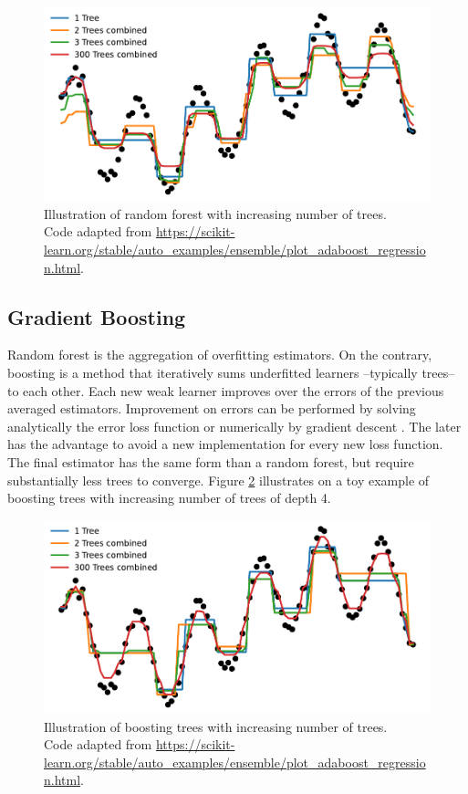 \documentclass[french,12pt,twoside,a4paper]{book}
\begin{document}
\begin{appendices}
  \begin{figure}[!t]
    \centering
    \includegraphics[width=0.8\linewidth]{img/chapter_1/forest_4.pdf}
    \caption{Illustration of random forest with increasing number of
      trees.\\Code adapted from
      \url{https://scikit-learn.org/stable/auto_examples/ensemble/plot_adaboost_regression.html}.}%
    \label{fig:forest_regression}
  \end{figure}


  \subsection{Gradient Boosting}\label{apd:intro:boosting}

  Random forest is the aggregation of overfitting estimators. On the contrary,
  boosting \citep{freund1995desicion} is a method that iteratively sums
  underfitted learners --typically trees-- to each other. Each new weak learner
  improves over the errors of the previous averaged estimators. Improvement on
  errors can be performed by solving analytically the error loss function or
  numerically by gradient descent \citep{friedman2001greedy}. The later has the
  advantage to avoid a new implementation for every new loss function. The final
  estimator has the same form than a random forest, but require substantially
  less trees to converge. Figure \ref{fig:boosting_regression} illustrates on a
  toy example of boosting trees with increasing number of trees of depth 4.

  \begin{figure}[!b]
    \centering
    \includegraphics[width=0.8\linewidth]{img/chapter_1/boosting_4.pdf}
    \caption{Illustration of boosting trees with increasing number of
      trees.\\Code adapted from
      \url{https://scikit-learn.org/stable/auto_examples/ensemble/plot_adaboost_regression.html}.}%
    \label{fig:boosting_regression}
  \end{figure}


\end{appendices}
\end{document}
